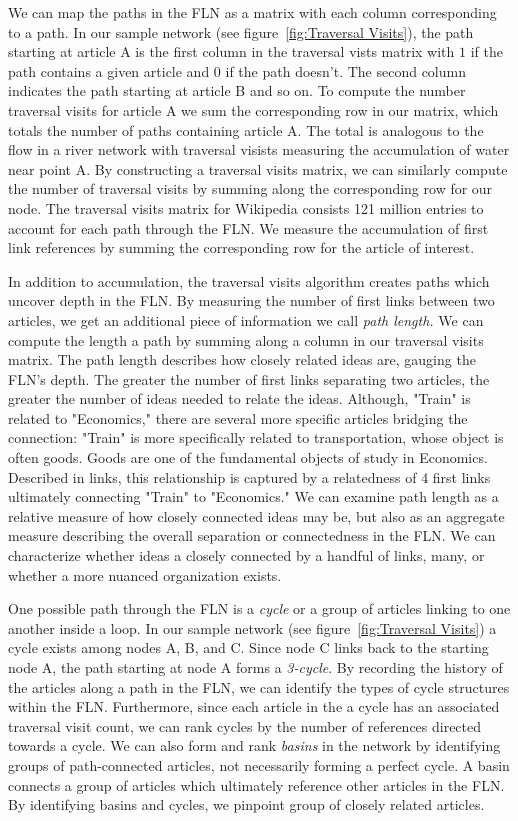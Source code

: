 \documentclass[pre,twocolumn,twoside,superscriptaddress,floatfix, aps, 10pt]{revtex4-1}
\begin{document}
We can map the paths in the FLN as a matrix with each column corresponding to a path. In our sample network 
(see figure~\ref{fig:Traversal Visits}), the path starting at article A is the 
first column in the traversal vists matrix with $1$ if the path contains a given article and 
$0$ if the path doesn't. The second column indicates the path starting at article B and so on. 
To compute the number traversal visits for article A we sum the corresponding row in our matrix,
which totals the number of paths containing article A. The total is analogous to the flow 
in a river network with traversal visists measuring the accumulation of water near point A. 
By constructing a traversal visits matrix, we can similarly compute the number of traversal 
visits by summing along the corresponding row for our node. The traversal visits matrix for 
Wikipedia consists 121 million entries to account for each path through the FLN. 
We measure the accumulation of first link references by summing the corresponding row for the 
article of interest.

In addition to accumulation, the traversal visits algorithm creates paths 
which uncover depth in the FLN. 
By measuring the number of first links between
two articles, we get an additional piece of information we call 
{\it path length.} We can compute the length a path by summing 
along a column in our traversal visits matrix. 
The path length describes how closely related ideas are, gauging the FLN's depth.
The greater the number of first links separating two articles, the greater the number of ideas needed to relate the ideas. Although, 
"Train" is related to "Economics," there are several more specific articles
bridging the connection:
"Train" is more specifically related to transportation, whose object
is often goods. Goods are one of the fundamental objects of study in Economics.
Described in links, this relationship is captured by a relatedness of $4$ 
first links ultimately connecting "Train" to "Economics." 
We can examine path length as a relative measure of how closely connected ideas
may be, but also as an aggregate measure describing the overall separation or 
connectedness in the FLN.
We can characterize whether ideas a closely connected by a handful of links, 
many, or whether a more nuanced organization exists. 


One possible path through the FLN is a {\it cycle} or a group of articles 
linking to one another inside a loop. In our sample network 
(see figure~\ref{fig:Traversal Visits}) 
a cycle exists among nodes A, B, and C. 
Since node C links back to the starting node A, the path starting at node A forms a {\it 3-cycle}. 
By recording the history of the articles along a path in the FLN, we can identify
the types of cycle structures within the FLN. Furthermore, since each article 
in the a cycle has an associated traversal visit count, we can rank cycles by 
the number of references directed towards a cycle. 
We can also form and rank {\it basins} in the network by identifying groups of 
path-connected articles, not necessarily forming a perfect cycle.
A basin connects a group of articles which ultimately reference other articles
in the FLN. By identifying basins and cycles, we pinpoint group of closely related articles.
\end{document}
